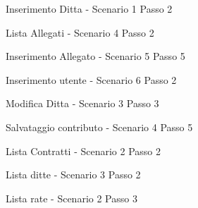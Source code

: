 \begin{figure}
	\centering
	\caption{Inserimento Ditta - Scenario 1 Passo 2}
	\label{aggiungiDitta}
\end{figure}

\begin{figure}
	\centering
	\caption{Lista Allegati - Scenario 4 Passo 2}
	\label{allegati}
\end{figure}

\begin{figure}
	\centering
	\caption{Inserimento Allegato - Scenario 5 Passo 5}
	\label{allegatiDopoInserimento}
\end{figure}

\begin{figure}
	\centering
	\caption{Inserimento utente - Scenario 6 Passo 2}
	\label{creazioneUtente}
\end{figure}

\begin{figure}
	\centering
	\caption{Modifica Ditta - Scenario 3 Passo 3}
	\label{modificaDitta}
\end{figure}

\begin{figure}
	\centering
	\caption{Salvataggio contributo - Scenario 4 Passo 5}
	\label{fineContributo}
\end{figure}

\begin{figure}
	\centering
	\caption{Lista Contratti - Scenario 2 Passo 2}
	\label{Lista delle convenzioni/contributi}
\end{figure}

\begin{figure}
	\centering
	\caption{Lista ditte - Scenario 3 Passo 2}
	\label{ListaDitte}
\end{figure}

\begin{figure}
	\centering
	\caption{Lista rate - Scenario 2 Passo 3}
	\label{ListaRate}
\end{figure}

